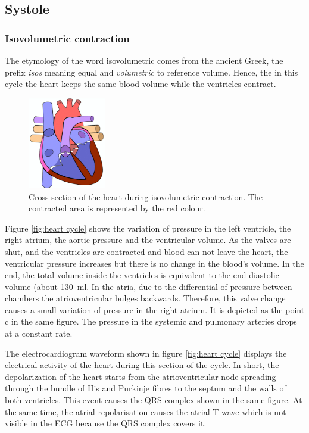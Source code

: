 \subsection{Systole}
\subsubsection{Isovolumetric contraction}
The etymology of the word isovolumetric comes from the ancient Greek, the prefix \textit{isos} meaning equal and \textit{volumetric} to reference volume. Hence, the in this cycle the heart keeps the same blood volume while the ventricles contract.

\begin{figure}[!htpb]
		\centering
		\includegraphics[height=4cm,keepaspectratio]{figure_3}   
		\caption[Heart during isovolumetric contaction]{Cross section of the heart during isovolumetric contraction. The contracted area is represented by the red colour.}
		\label{fig:heart isovolumic}
\end{figure}

Figure \ref{fig:heart cycle} shows the variation of pressure in the left ventricle, the right atrium, the aortic pressure and the ventricular volume. As the valves are shut, and the ventricles are contracted and blood can not leave the heart, the ventricular pressure increases but there is no change in the blood's volume. In the end, the total volume inside the ventricles is equivalent to the end-diastolic volume (about \SI{130}{\milli\litre}. In the atria, due to the differential of pressure between chambers the atrioventricular bulges backwards. Therefore, this valve change causes a small variation of pressure in the right atrium. It is depicted as the point c in the same figure. The pressure in the systemic and pulmonary arteries drops at a constant rate. 


The electrocardiogram waveform shown in figure \ref{fig:heart cycle} displays the electrical activity of the heart during this section of the cycle. In short, the depolarization of the heart starts from the atrioventricular node spreading through the bundle of His and Purkinje fibres to the septum and the walls of both ventricles. This event causes the QRS complex shown in the same figure. At the same time, the atrial repolarisation causes the atrial T wave which is not visible in the ECG because the QRS complex covers it.

